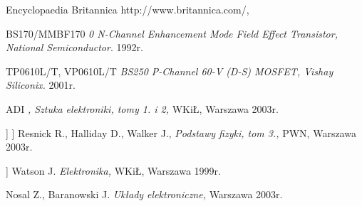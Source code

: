 \documentclass[polish,polish,a4paper]{article}
\begin{document}
	\begin{thebibliography}{99}
		Encyclopaedia Britannica http://www.britannica.com/, 
		
		BS170/MMBF170 \emph{0 N-Channel Enhancement Mode Field Effect Transistor, National Semiconductor}. 1992r.
		
		TP0610L/T, VP0610L/T \emph{BS250 P-Channel 60-V (D-S) MOSFET, Vishay Siliconix.} 2001r.

		 ADI \emph{, Sztuka elektroniki, tomy 1. i 2, } WKiŁ, Warszawa 2003r.
		
		] ] Resnick R., Halliday D., Walker J.,  \emph{Podstawy fizyki, tom 3.,} PWN, Warszawa 2003r.
		
		] Watson J. \emph{ Elektronika,} WKiŁ, Warszawa 1999r.
		
		Nosal Z., Baranowski J. \emph{Układy elektroniczne,} Warszawa 2003r.
	\end{thebibliography}
		
	\newpage
	\tableofcontents
		
\end{document}
